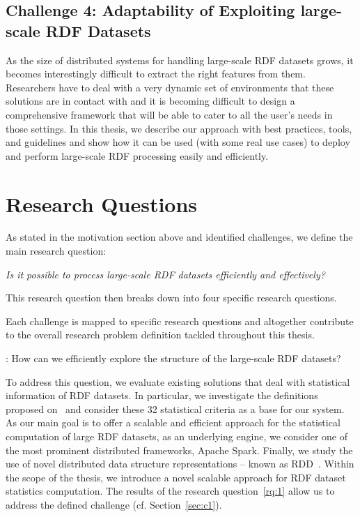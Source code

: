 \subsection{Challenge 4: Adaptability of Exploiting large-scale RDF Datasets}
\label{sec:c4}
As the size of distributed systems for handling large-scale \gls{RDF} datasets grows, it becomes interestingly difficult to extract the right features from them.
Researchers have to deal with a very dynamic set of environments that these solutions are in contact with and it is becoming difficult to design a comprehensive framework that will be able to cater to all the user's needs in those settings.
In this thesis, we describe our approach with best practices, tools, and guidelines and show how it can be used (with some real use cases) to deploy and perform large-scale \gls{RDF} processing easily and efficiently.


\section{Research Questions}
\label{sec:research-questions}

As stated in the motivation section above and identified challenges, we define the main research question:

\begin{tcolorbox}
\centering
\textit{Is it possible to process large-scale \gls{RDF} datasets efficiently and effectively?}
\end{tcolorbox}

This research question then breaks down into four specific research questions.

Each challenge is mapped to specific research questions and altogether contribute to the overall research problem definition tackled throughout this thesis.

\begin{tcolorbox}
\textbf{\rqNr[RQ1]\label{rq:1}}: How can we efficiently explore the structure of the large-scale \gls{RDF} datasets?
\end{tcolorbox}

To address this question, we evaluate existing solutions that deal with statistical information of \gls{RDF} datasets.
In particular, we investigate the definitions proposed on~\cite{demter-2012-ekaw} and consider these 32 statistical criteria as a base for our system.
As our main goal is to offer a scalable and efficient approach for the statistical computation of large \gls{RDF} datasets, as an underlying engine, we consider one of the most prominent distributed frameworks, Apache Spark.
Finally, we study the use of novel distributed data structure representations -- known as \gls{RDD}~\cite{zaharia2012resilient}.
Within the scope of the thesis, we introduce a novel scalable approach for \gls{RDF} dataset statistics computation.
The results of the research question~\ref{rq:1} allow us to address the defined challenge (cf. Section~\ref{sec:c1}).


